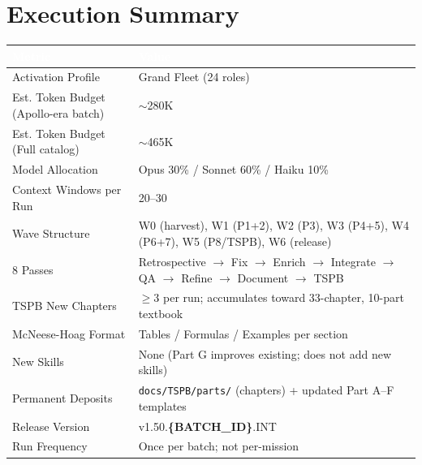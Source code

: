 \documentclass[11pt,letterpaper]{article}
\newcommand{\param}[1]{\textcolor{paramred}{\textbf{\{#1\}}}}
\newcommand{\tableheader}[1]{\textbf{\sffamily\textcolor{white}{#1}}}
\begin{document}
\section{Execution Summary}

\begin{center}
\begin{tabularx}{\textwidth}{L{5.5cm}X}
\toprule
{}
\tableheader{Metric} & \tableheader{Value} \\
\midrule
Activation Profile & Grand Fleet (24 roles) \\
Est. Token Budget (Apollo-era batch) & $\sim$280K \\
Est. Token Budget (Full catalog) & $\sim$465K \\
Model Allocation & Opus 30\% / Sonnet 60\% / Haiku 10\% \\
Context Windows per Run & 20--30 \\
Wave Structure & W0 (harvest), W1 (P1+2), W2 (P3), W3 (P4+5), W4 (P6+7), W5 (P8/TSPB), W6 (release) \\
8 Passes & Retrospective $\to$ Fix $\to$ Enrich $\to$ Integrate $\to$ QA $\to$ Refine $\to$ Document $\to$ TSPB \\
TSPB New Chapters & $\geq$3 per run; accumulates toward 33-chapter, 10-part textbook \\
McNeese-Hoag Format & Tables / Formulas / Examples per section \\
New Skills & None (Part G improves existing; does not add new skills) \\
Permanent Deposits & \texttt{docs/TSPB/parts/} (chapters) + updated Part A--F templates \\
Release Version & v1.50.\param{BATCH\_ID}.INT \\
Run Frequency & Once per batch; not per-mission \\
\bottomrule
\end{tabularx}
\end{center}

\vspace{2em}
\end{document}

